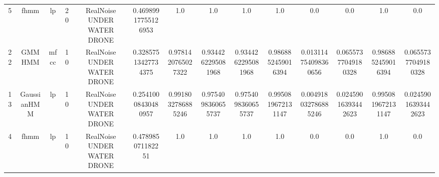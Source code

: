 \begin{table}[htb]
\begin{tabular}{@{}cccccccccccccc@{}}
        5 & fhmm & lp & 20 & RealNoise UNDER WATER DRONE & 0.46989917755126953 & 1.0 & 1.0 & 1.0 & 1.0 & 0.0 & 0.0 & 1.0 & 0.0 \\
        22 & GMMHMM & mfcc & 10 & RealNoise UNDER WATER DRONE & 0.32857513427734375 & 0.9781420765027322 & 0.9344262295081968 & 0.9344262295081968 & 0.9868852459016394 & 0.013114754098360656 & 0.06557377049180328 & 0.9868852459016394 & 0.06557377049180328 \\
        13 & GaussianHMM & lp & 10 & RealNoise UNDER WATER DRONE & 0.25410008430480957 & 0.9918032786885246 & 0.9754098360655737 & 0.9754098360655737 & 0.9950819672131147 & 0.004918032786885246 & 0.02459016393442623 & 0.9950819672131147 & 0.02459016393442623 \\
        4 & fhmm & lp & 10 & RealNoise UNDER WATER DRONE & 0.478985071182251 & 1.0 & 1.0 & 1.0 & 1.0 & 0.0 & 0.0 & 1.0 & 0.0 \\
        \bottomrule
    \end{tabular}
\end{table}